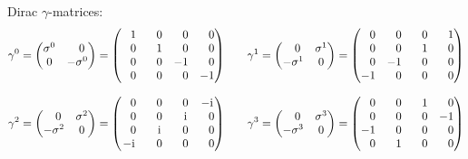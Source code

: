 			\noindent
			Dirac $\gamma$-matrices:
			\begin{equation}
				\begin{aligned}
					\gamma^0
					= \left( \begin{matrix}
					\sigma^0 & \M0 \\
					0 &  -\sigma^0
					\end{matrix} \right)
					= \left( \begin{matrix}
					\M 1 & \M 0 & \M 0 & \M 0 \\
					\M 0 & \M 1 & \M 0 & \M 0 \\
					\M 0 & \M 0 &   -1 & \M 0 \\
					\M 0 & \M 0 & \M 0 &   -1 \\
					\end{matrix} \right)
					&\hspace{20pt}
					\gamma^1
					= \left( \begin{matrix}
					\M0 & \sigma^1 \\
					-\sigma^1 &  0
					\end{matrix} \right)
					= \left( \begin{matrix}
					\M 0 & \M 0 & \M 0 & \M 1 \\
					\M 0 & \M 0 & \M 1 & \M 0 \\
					\M 0 &   -1 & \M 0 & \M 0 \\
					-1 & \M 0 & \M 0 & \M 0 \\
					\end{matrix} \right) \\[8pt]
					\gamma^2
					= \left( \begin{matrix}
					\M0 & \sigma^2 \\
					-\sigma^2 &  0
					\end{matrix} \right)
					= \left( \begin{matrix}
					\M 0 & \M 0 & \M 0 &  -\i \\
					\M 0 & \M 0 & \M\i & \M 0 \\
					\M 0 & \M\i & \M 0 & \M 0 \\
					-\i & \M 0 & \M 0 & \M 0 \\
					\end{matrix} \right)
					&\hspace{20pt}
					\gamma^3
					= \left( \begin{matrix}
					\M 0 & \sigma^3 \\
					-\sigma^3 &  0
					\end{matrix} \right)
					= \left( \begin{matrix}
					\M 0 & \M 0 & \M 1 & \M 0 \\
					\M 0 & \M 0 & \M 0 &   -1 \\
					-1 & \M 0 & \M 0 & \M 0 \\
					\M 0 & \M 1 & \M 0 & \M 0 \\
					\end{matrix} \right) \\
				\end{aligned}
			\end{equation}

